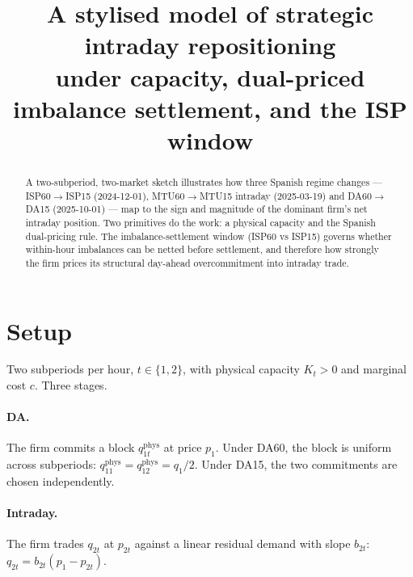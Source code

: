 \documentclass[11pt,a4paper]{article}
\title{A stylised model of strategic intraday repositioning\\under
capacity, dual-priced imbalance settlement, and the ISP window}
\author{}
\date{}
\begin{document}
\maketitle

\begin{abstract}
A two-subperiod, two-market sketch illustrates how three Spanish regime
changes --- ISP60$\to$ISP15 (2024-12-01), MTU60$\to$MTU15 intraday
(2025-03-19) and DA60$\to$DA15 (2025-10-01) --- map to the sign and
magnitude of the dominant firm's net intraday position. Two primitives
do the work: a physical capacity and the Spanish dual-pricing rule. The
imbalance-settlement window (ISP60 vs ISP15) governs whether within-hour
imbalances can be netted before settlement, and therefore how strongly
the firm prices its structural day-ahead overcommitment into intraday
trade.
\end{abstract}

\section{Setup}

Two subperiods per hour, $t \in \{1,2\}$, with physical capacity
$K_t > 0$ and marginal cost $c$. Three stages.

\paragraph{DA.} The firm commits a block $q_{1t}^{\mathrm{phys}}$ at
price $p_1$. Under DA60, the block is uniform across subperiods:
$q_{11}^{\mathrm{phys}} = q_{12}^{\mathrm{phys}} = q_1/2$. Under DA15,
the two commitments are chosen independently.

\paragraph{Intraday.} The firm trades $q_{2t}$ at $p_{2t}$ against a
linear residual demand with slope $b_{2t}$:
$q_{2t}=b_{2t}(p_{1}-p_{2t})$.
\end{document}

